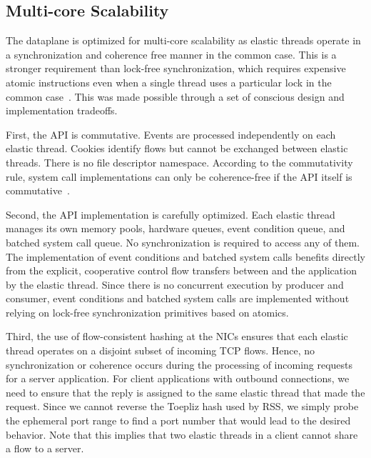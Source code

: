 \subsection{Multi-core Scalability}
\label{sec:impl:cohfree}

The \ix dataplane is optimized for multi-core scalability as elastic
threads operate in a synchronization and coherence free manner in the
common case. This is a stronger requirement than lock-free
synchronization, which requires expensive atomic instructions even
when a single thread uses a particular lock in the common
case~\cite{DBLP:conf/sosp/DavidGT13}.  This was made possible 
through a set of conscious design and implementation tradeoffs. 

First, the \ix API is commutative. Events are processed independently
on each elastic thread. Cookies identify flows but cannot be exchanged
between elastic threads. There is no file descriptor namespace.
According to the commutativity rule, system call implementations can
only be coherence-free if the API itself is
commutative~\cite{DBLP:conf/sosp/ClementsKZMK13}.

Second, the API implementation is carefully optimized.  Each elastic
thread manages its own memory pools, hardware queues, event condition
queue, and batched system call queue. No synchronization is required
to access any of them. The implementation of event conditions and
batched system calls benefits directly from the explicit, cooperative
control flow transfers between \ix and the application by the elastic
thread.  Since there is no concurrent execution by producer and
consumer, event conditions and batched system calls are implemented
without relying on lock-free synchronization primitives based
on atomics.

Third, the use of flow-consistent hashing at the NICs ensures that
each elastic thread operates on a disjoint subset of incoming TCP
flows. Hence, no synchronization or coherence occurs during the
processing of incoming requests for a server application. For client
applications with outbound connections, we need to ensure that the
reply is assigned to the same elastic thread that made the
request. Since we cannot reverse the Toepliz hash used by RSS, we
simply probe the ephemeral port range to find a port number that
would lead to the desired behavior. Note that this implies that two
elastic threads in a client cannot share a flow to a server. 
 
